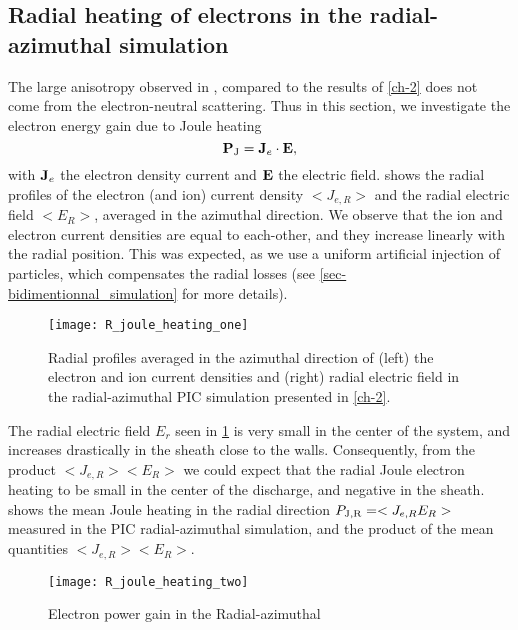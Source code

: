   \subsection{Radial heating of electrons in the radial-azimuthal simulation} \label{subsec-radial-heating}
  
  The large anisotropy observed in , compared to the results of \cref{ch-2} does not come from the electron-neutral scattering.
  Thus in this section, we investigate the electron energy gain due to Joule heating
  \begin{equation} \label{eq-epower}
      {\mathbf P_{\rm J}} = {\mathbf J_e} \cdot {\mathbf E},
  \end{equation}
  with ${\mathbf J_e}$ the electron density current and ${\mathbf E}$ the electric field.
   shows the radial profiles of the electron (and ion) current density $< J_{e, R}>$ and the radial electric field $ < E_R >$, averaged in the azimuthal direction.
  We observe that the ion and electron current densities are equal to each-other, and they increase linearly with the radial position.
  This was expected, as we use a uniform artificial injection of particles, which compensates the radial losses (see \cref{sec-bidimentionnal_simulation} for more details).

  \begin{figure}[hbt]
    \centering
    \texttt{[image: R\_joule\_heating\_one]}
    \caption{Radial profiles averaged in the azimuthal direction of (left) the electron and ion current densities and (right) radial electric field in the radial-azimuthal \ac{PIC} simulation presented in \cref{ch-2}. }
    \label{fig-epower_radialone}
  \end{figure}
  
  The radial electric field $E_r$ seen in \cref{fig-epower_radialone} is very small in the center of the system, and increases drastically in the sheath close to the walls.
  Consequently, from the product $< J_{e, R}>  < E_R >$ we could expect that the radial Joule electron heating to be small in the center of the discharge, and negative in the sheath.
   shows the mean Joule heating in the radial direction ${P_{\rm J, R}} = < J_{e, R} E_R >$ measured in the \ac{PIC} radial-azimuthal simulation, and the product of the mean quantities $< J_{e, R}>  < E_R >$.

  \begin{figure}[hbt]
    \centering
    \texttt{[image: R\_joule\_heating\_two]}
    \caption{Electron power gain in the Radial-azimuthal }
    \label{fig-epower_radial}
  \end{figure}

